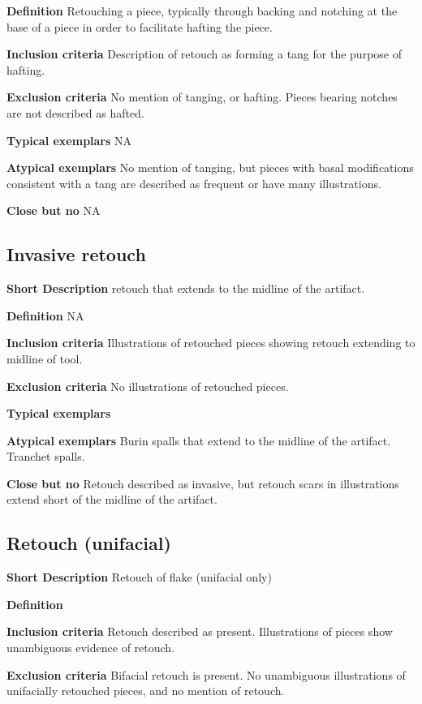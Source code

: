 \documentclass[
]{article}
\begin{document}
\textbf{Definition} Retouching a piece, typically through backing and
notching at the base of a piece in order to facilitate hafting the
piece.

\textbf{Inclusion criteria} Description of retouch as forming a tang for
the purpose of hafting.

\textbf{Exclusion criteria} No mention of tanging, or hafting. Pieces
bearing notches are not described as hafted.

\textbf{Typical exemplars} NA

\textbf{Atypical exemplars} No mention of tanging, but pieces with basal
modifications consistent with a tang are described as frequent or have
many illustrations.

\textbf{Close but no} NA

\hypertarget{invasive-retouch}{%
\subsection{Invasive retouch}\label{invasive-retouch}}

\textbf{Short Description} retouch that extends to the midline of the
artifact.

\textbf{Definition} NA

\textbf{Inclusion criteria} Illustrations of retouched pieces showing
retouch extending to midline of tool.

\textbf{Exclusion criteria} No illustrations of retouched pieces.

\textbf{Typical exemplars}

\textbf{Atypical exemplars} Burin spalls that extend to the midline of
the artifact. Tranchet spalls.

\textbf{Close but no} Retouch described as invasive, but retouch scars
in illustrations extend short of the midline of the artifact.

\hypertarget{retouch-unifacial}{%
\subsection{Retouch (unifacial)}\label{retouch-unifacial}}

\textbf{Short Description} Retouch of flake (unifacial only)

\textbf{Definition}

\textbf{Inclusion criteria} Retouch described as present. Illustrations
of pieces show unambiguous evidence of retouch.

\textbf{Exclusion criteria} Bifacial retouch is present. No unambiguous
illustrations of unifacially retouched pieces, and no mention of
retouch.
\end{document}
